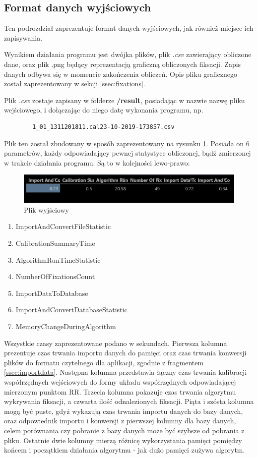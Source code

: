 \subsection{Format danych wyjściowych}
Ten podrozdział zaprezentuje format danych wyjściowych, jak również miejsce ich zapisywania.\par
Wynikiem działania programu jest dwójka plików, plik \emph{.csv} zawierający obliczone dane, oraz plik .png będący reprezentacją graficzną obliczonych fiksacji. Zapis danych odbywa się w momencie zakończenia obliczeń. Opis pliku graficznego został zaprezentowany w sekcji \ref{ssec:fixations}.\par
Plik \emph{.csv} zostaje zapisany w folderze \textbf{/result}, posiadając w nazwie nazwę pliku wejściowego, i dołączając do niego datę wykonania programu, np. 
\begin{verbatim}
        1_01_1311201811.cal23-10-2019-173857.csv
\end{verbatim}
Plik ten został zbudowany w sposób zaprezentowany na rysunku \ref{fig:exportfile}. Posiada on 6 parametrów, każdy odpowiadający pewnej statystyce obliczonej, bądź zmierzonej w trakcie działania programu. Są to w kolejności lewo-prawo:
\begin{figure}[H]
        \centering
        \captionsetup{justification=centering,margin=2cm}
        \includegraphics[width=0.8\linewidth]{resources/exportfile.png}
        \caption{Plik wyjściowy}
        \label{fig:exportfile}
\end{figure}
\begin{enumerate}
        \itemsep1em 
        \item ImportAndConvertFileStatistic
        \item CalibrationSummaryTime
        \item AlgorithmRunTimeStatistic
        \item NumberOfFixationsCount
        \item ImportDataToDatabase
        \item ImportAndConvertDatabaseStatistic
        \item MemoryChangeDuringAlgorithm
\end{enumerate}
Wszystkie czasy zaprezentowane podano w sekundach. Pierwsza kolumna prezentuje czas trwania importu danych do pamięci oraz czas trwania konwersji plików do formatu czytelnego dla aplikacji, zgodnie z fragmentem \ref{ssec:importdata}. Następna kolumna przedstawia łączny czas trwania kalibracji współrzędnych wejściowych do formy układu współrzędnych odpowiadającej mierzonym punktom RR. Trzecia kolumna pokazuje czas trwania algorytmu wykrywania fiksacji, a czwarta ilość odnalezionych fiksacji. Piąta i szósta kolumna mogą być puste, gdyż wykazują czas trwania importu danych do bazy danych, oraz odpowiednik importu i konwersji z pierwszej kolumny dla bazy danych, celem porównania czy pobranie z bazy danych może być szybsze od pobrania z pliku. Ostatnie dwie kolumny mierzą różnicę wykorzystania pamięci pomiędzy końcem i początkiem działania algorytmu - jak dużo pamięci zużywa algorytm.\par
